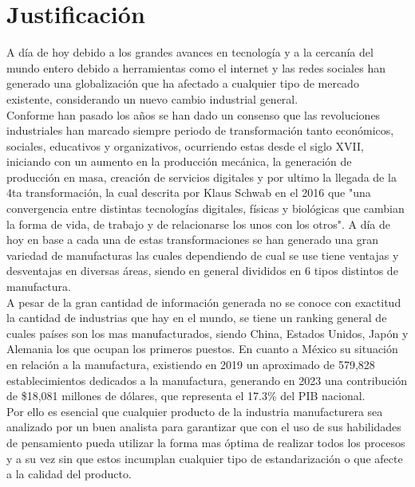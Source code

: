     \section{Justificación}
    
        A día de hoy debido a los grandes avances en tecnología y a la cercanía del mundo entero debido a herramientas como el internet y las redes sociales han generado una globalización que ha afectado a cualquier tipo de mercado existente, considerando un nuevo cambio industrial general. 
         \\Conforme han pasado los años se han dado un consenso que las revoluciones industriales han marcado siempre periodo de transformación tanto económicos, sociales, educativos y organizativos, ocurriendo estas desde el siglo XVII, iniciando con un aumento en la producción mecánica, la generación de producción en masa, creación de servicios digitales y por ultimo la llegada de la 4ta transformación, la cual descrita por Klaus Schwab en el 2016 que "una convergencia entre distintas tecnologías digitales, físicas y biológicas que cambian la forma de vida, de trabajo y de relacionarse los unos con los otros".\cite{4Rev} A día de hoy en base a cada una de estas transformaciones se han generado una gran variedad de manufacturas las cuales dependiendo de cual se use tiene ventajas y desventajas en diversas áreas, siendo en general divididos en 6 tipos distintos de manufactura. \cite{UCSP}
         \\A pesar de la gran cantidad de información generada no se conoce con exactitud la cantidad de industrias que hay en el mundo, se tiene un ranking  general de cuales países son los mas manufacturados, siendo China, Estados Unidos, Japón y Alemania los que ocupan los primeros puestos. En cuanto a México su situación en relación a la manufactura, existiendo en 2019 un aproximado de 579,828 establecimientos dedicados a la manufactura\cite{SEDECO}, generando en 2023 una contribución de \$18,081 millones de dólares, que representa el 17.3\% del PIB nacional.
         \\Por ello es esencial que cualquier producto de la industria manufacturera sea analizado por un buen analista para garantizar que con el uso de sus habilidades de pensamiento pueda utilizar la forma mas óptima de realizar todos los procesos y a su vez sin que estos incumplan cualquier tipo de estandarización o que afecte a la calidad del producto.\cite{Indeed}
